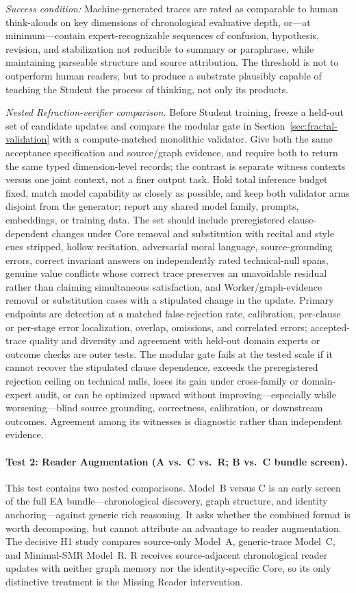 \emph{Success condition:} Machine-generated traces are rated as comparable
to human think-alouds on key dimensions of chronological evaluative
depth, or---at minimum---contain expert-recognizable sequences of confusion,
hypothesis, revision, and stabilization not reducible to summary or paraphrase,
while maintaining parseable structure and source attribution. The threshold is
not to outperform human readers, but to produce a substrate plausibly capable of
teaching the Student the process of thinking, not only its products.

\emph{Nested Refraction-verifier comparison.} Before Student training, freeze a
held-out set of candidate updates and compare the modular gate in
Section~\ref{sec:fractal-validation} with a compute-matched monolithic
validator. Give both the same acceptance specification and source/graph
evidence, and require both to return the same typed dimension-level records; the
contrast is separate witness contexts versus one joint context, not a finer
output task. Hold total inference budget fixed, match model capability as
closely as possible, and keep both validator arms disjoint from the generator;
report any shared model family, prompts, embeddings, or training data. The set
should include preregistered clause-dependent changes under Core removal and
substitution with recital and style cues stripped, hollow recitation,
adversarial moral language, source-grounding errors, correct invariant answers
on independently rated technical-null spans, genuine value conflicts whose
correct trace preserves an unavoidable residual rather than claiming
simultaneous satisfaction, and Worker/graph-evidence removal or substitution
cases with a stipulated change in the update. Primary endpoints are detection
at a matched false-rejection rate, calibration, per-clause or per-stage error
localization, overlap, omissions, and correlated errors;
accepted-trace quality and diversity and agreement with held-out domain experts
or outcome checks are outer tests.
The modular gate fails at the tested scale if it cannot recover the stipulated
clause dependence, exceeds the preregistered rejection ceiling on technical
nulls, loses its gain under cross-family or domain-expert audit, or can be
optimized upward without improving---especially while worsening---blind source
grounding, correctness, calibration, or downstream outcomes. Agreement among
its witnesses is diagnostic rather than independent evidence.

\paragraph{Test 2: Reader Augmentation (A vs.\ C vs.\ R; B vs.\ C bundle screen).}
This test contains two nested comparisons. Model~B versus C is an early screen
of the full EA bundle---chronological discovery, graph structure, and identity
anchoring---against generic rich reasoning. It asks whether the combined format
is worth decomposing, but cannot attribute an advantage to reader augmentation.
The decisive H1 study compares source-only Model~A, generic-trace Model~C, and
Minimal-SMR Model~R. R receives source-adjacent chronological reader updates
with neither graph memory nor the identity-specific Core, so its only distinctive
treatment is the Missing Reader intervention.

